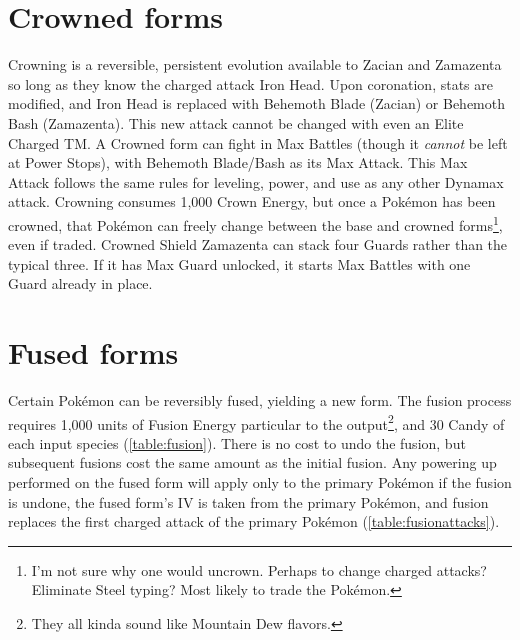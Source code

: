 \section{Crowned forms\label{sec:crowned}}
\nopagecolor
Crowning is a reversible, persistent evolution available to Zacian and Zamazenta
 so long as they know the charged attack Iron Head.
Upon coronation, stats are modified, and Iron Head is replaced with Behemoth Blade (Zacian)
  or Behemoth Bash (Zamazenta).
This new attack cannot be changed with even an Elite Charged TM\@.
A Crowned form can fight in Max Battles (though it \textit{cannot} be left at Power Stops), with Behemoth Blade/Bash as its Max Attack.
This Max Attack follows the same rules for leveling, power, and use as any other Dynamax attack.
Crowning consumes 1,000 Crown Energy, but once a Pokémon has been crowned,
  that Pokémon can freely change between the base and crowned
  forms\footnote{I'm not sure why one would uncrown. Perhaps to change charged attacks?
    Eliminate Steel typing? Most likely to trade the Pokémon.}, even if traded.
Crowned Shield Zamazenta can stack four Guards rather than the typical three.
If it has Max Guard unlocked, it starts Max Battles with one Guard already in place.



\section{Fused forms\label{sec:fusion}}
Certain Pokémon can be reversibly fused, yielding a new form.
The fusion process requires 1,000 units of Fusion Energy particular to the output\footnote{They all kinda sound like Mountain Dew flavors.},
 and 30 Candy of each input species (\autoref{table:fusion}).
There is no cost to undo the fusion, but subsequent fusions cost the same amount as the initial fusion.
Any powering up performed on the fused form will apply only to the primary
  Pokémon if the fusion is undone, the fused form's IV is taken from the primary Pokémon,
  and fusion replaces the first charged attack of the primary Pokémon (\autoref{table:fusionattacks}).

